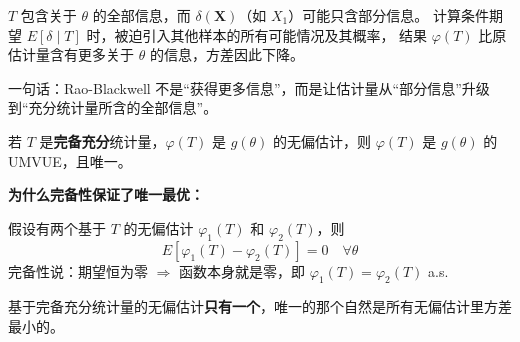 \begin{dxtips}
$T$ 包含关于 $\theta$ 的全部信息，而 $\delta(\boldsymbol{X})$（如 $X_1$）可能只含部分信息。
计算条件期望 $E[\delta \mid T]$ 时，被迫引入其他样本的所有可能情况及其概率，
结果 $\varphi(T)$ 比原估计量含有更多关于 $\theta$ 的信息，方差因此下降。

一句话：Rao-Blackwell 不是``获得更多信息''，而是让估计量从``部分信息''升级到``充分统计量所含的全部信息''。
\end{dxtips}
\begin{note}
若 $T$ 是\textbf{完备充分}统计量，$\varphi(T)$ 是 $g(\theta)$ 的无偏估计，则 $\varphi(T)$ 是 $g(\theta)$ 的 UMVUE，且唯一。

\textbf{为什么完备性保证了唯一最优：}

假设有两个基于 $T$ 的无偏估计 $\varphi_1(T)$ 和 $\varphi_2(T)$，则
$$E[\varphi_1(T) - \varphi_2(T)] = 0 \quad \forall\theta$$
完备性说：期望恒为零 $\Rightarrow$ 函数本身就是零，即 $\varphi_1(T) = \varphi_2(T)$ a.s.

基于完备充分统计量的无偏估计\textbf{只有一个}，唯一的那个自然是所有无偏估计里方差最小的。
\end{note}
